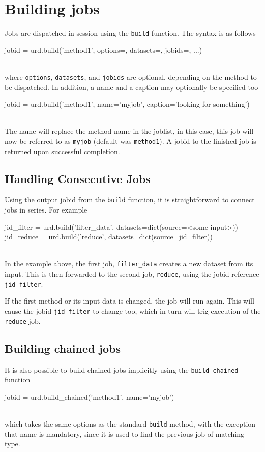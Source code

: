 \newpage
\section{Building jobs}

Jobs are dispatched in session using the \texttt{build} function.  The
syntax is as follows
\\
\begin{python}
  jobid = urd.build('method1', options={}, datasets={}, jobids={}, ...)
\end{python}
\\
where \texttt{options}, \texttt{datasets}, and \texttt{jobids} are
optional, depending on the method to be dispatched.  In addition, a
name and a caption may optionally be specified too
\\
\begin{python}
  jobid = urd.build('method1', name='myjob', caption='looking for something')
\end{python}
\\
The name will replace the method name in the joblist, in this case,
this job will now be referred to as \texttt{myjob} (default was
\texttt{method1}).  A jobid to the finished job is returned upon
successful completion.



\subsection{Handling Consecutive Jobs}
Using the output jobid from the \texttt{build} function, it is
straightforward to connect jobs in series.  For example\\
\begin{python}
  jid_filter = urd.build('filter_data', datasets=dict(source=<some input>))
  jid_reduce = urd.build('reduce', datasets=dict(source=jid_filter))
\end{python}
\\
In the example above, the first job, \texttt{filter\_data} creates a
new dataset from its input.  This is then forwarded to the second job,
\texttt{reduce}, using the jobid reference \texttt{jid\_filter}.

If the first method or its input data is changed, the job will run
again.  This will cause the jobid \texttt{jid\_filter} to change too,
which in turn will trig execution of the \texttt{reduce} job.



\subsection{Building chained jobs}
It is also possible to build chained jobs implicitly using the
\texttt{build\_chained} function
\\
\begin{python}
  jobid = urd.build_chained('method1', name='myjob')
\end{python}
\\
which takes the same options as the standard \texttt{build} method,
with the exception that name is mandatory, since it is used to find
the previous job of matching type.




